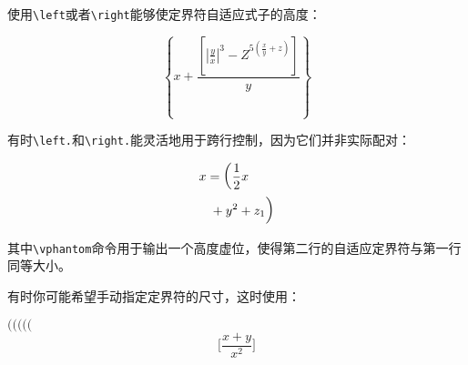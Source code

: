 {使用\verb|\left|或者\verb|\right|能够使定界符自适应式子的高度：

\begin{codeshow}
\[\left\{x+\frac{\left[\left|\frac
{y}{x}\right|^3-Z^{5\left(\frac{x}
{y}+z\right)}\right]}{y}\right\}\]
\end{codeshow}

有时\verb|\left.|和\verb|\right.|能灵活地用于跨行控制，因为它们并非实际配对：

\begin{codeshow}
\begin{align*}
  x &=\left(\frac{1}{2}x\right.\\
  &\left.\vphantom{\frac{1}{2}}
  +y^2+z_1\right)
\end{align*}
\end{codeshow}

其中\verb|\vphantom|命令用于输出一个高度虚位，使得第二行的自适应定界符与第一行同等大小。

有时你可能希望手动指定定界符的尺寸，这时使用：

\begin{codeshow}
  $(\big(\Big(\bigg(\Bigg($ \\
  \[\bigl[\frac{x+y}{x^2}\bigr]\]
\end{codeshow}

}
